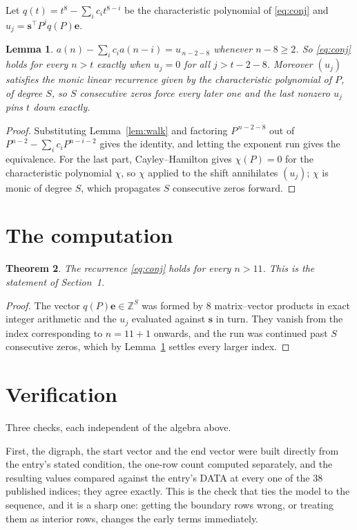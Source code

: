 \documentclass[11pt,a4paper]{article}
\theoremstyle{plain}
\newtheorem{theorem}{Theorem}
\newtheorem{lemma}[theorem]{Lemma}
\theoremstyle{definition}
\begin{document}
Let $q(t)=t^{8}-\sum_i c_i t^{8-i}$ be the characteristic polynomial of
\eqref{eq:conj} and $u_j=\mathbf{s}^{\!\top}P^{j}q(P)\mathbf{e}$.

\begin{lemma}\label{lem:crit}
$a(n)-\sum_i c_i a(n-i)=u_{\,n-2-8}$ whenever $n-8\ge2$. So \eqref{eq:conj}
holds for every $n>t$ exactly when $u_j=0$ for all $j>t-2-8$. Moreover $(u_j)$
satisfies the monic linear recurrence given by the characteristic polynomial of $P$, of
degree $S$, so $S$ consecutive zeros force every later one and the last nonzero $u_j$ pins
$t$ down exactly.
\end{lemma}

\begin{proof}
Substituting Lemma~\ref{lem:walk} and factoring $P^{\,n-2-8}$ out of
$P^{n-2}-\sum_i c_i P^{n-i-2}$ gives the identity, and letting the exponent run gives the
equivalence. For the last part, Cayley--Hamilton gives $\chi(P)=0$ for the characteristic
polynomial $\chi$, so $\chi$ applied to the shift annihilates $(u_j)$; $\chi$ is monic of
degree $S$, which propagates $S$ consecutive zeros forward.
\end{proof}

\section{The computation}

\begin{theorem}
The recurrence \eqref{eq:conj} holds for every $n>11$. This is the statement of
Section~1.
\end{theorem}

\begin{proof}
The vector $q(P)\mathbf{e}\in\mathbb{Z}^{S}$ was formed by $8$ matrix--vector
products in exact integer arithmetic and the $u_j$ evaluated against $\mathbf{s}$ in turn.
They vanish from the index corresponding to $n=11+1$ onwards, and the run was continued
past $S$ consecutive zeros, which by Lemma~\ref{lem:crit} settles every larger index.
\end{proof}

\section{Verification}

Three checks, each independent of the algebra above.

First, the digraph, the start vector and the end vector were built directly from the
entry's stated condition, the one-row count computed separately, and the resulting values
compared against the entry's DATA at every one of the $38$ published indices; they
agree exactly. This is the check that ties the model to the sequence, and it is a sharp one:
getting the boundary rows wrong, or treating them as interior rows, changes the early terms
immediately.
\end{document}
